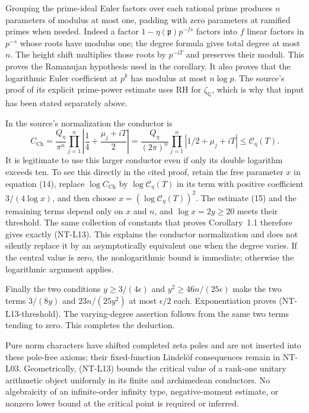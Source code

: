 Grouping the prime-ideal Euler factors over each rational
prime produces $n$ parameters of modulus at most one,
padding with zero parameters at ramified primes when needed.
Indeed a factor $1-\eta(\mathfrak p)p^{-fs}$ factors into
$f$ linear factors in $p^{-s}$ whose roots have modulus one;
the degree formula gives total degree at most $n$.
The height shift multiplies those roots by $p^{-iT}$ and
preserves their moduli.  This proves the Ramanujan hypothesis
used in the corollary.  It also proves that the logarithmic
Euler coefficient at $p^k$ has modulus at most $n\log p$.
The source's proof of its explicit prime-power estimate uses
RH for $\zeta_{\mathbb Q}$, which is why that input has been
stated separately above.

In the source's normalization the conductor is
\[
 C_{\mathrm{Ch}}=
 \frac{Q_\eta}{\pi^n}
        \prod_{j=1}^n\left|\frac14+
                              \frac{\mu_j+iT}{2}\right|
 =\frac{Q_\eta}{(2\pi)^n}
        \prod_{j=1}^n|1/2+\mu_j+iT|
 \le\mathscr C_\eta(T).
\]
It is legitimate to use this larger conductor even if only
its double logarithm exceeds ten.  To see this directly in
the cited proof, retain the free parameter $x$ in equation
(14), replace $\log C_{\mathrm{Ch}}$ by
$\log\mathscr C_\eta(T)$ in its term with positive
coefficient $3/(4\log x)$, and then choose
$x=(\log\mathscr C_\eta(T))^2$.
The estimate (15) and the remaining terms depend only on
$x$ and $n$, and $\log x=2y\ge20$ meets their threshold.
The same collection of constants that proves Corollary~1.1
therefore gives exactly (NT-L13).  This explains the conductor
normalization and does not silently replace it by an
asymptotically equivalent one when the degree varies.
If the central value is zero, the nonlogarithmic bound is
immediate; otherwise the logarithmic argument applies.

Finally the two conditions
$y\ge3/(4\epsilon)$ and
$y^2\ge46n/(25\epsilon)$ make the two terms
$3/(8y)$ and $23n/(25y^2)$ at most $\epsilon/2$ each.
Exponentiation proves (NT-L13-threshold).
The varying-degree assertion follows from the same two
terms tending to zero.  This completes the deduction.

Pure norm characters have shifted completed zeta poles and
are not inserted into these pole-free axioms; their fixed-function
Lindel\"of consequences remain in NT-L03.  Geometrically,
(NT-L13) bounds the critical value of a rank-one unitary
arithmetic object uniformly in its finite and archimedean
conductors.  No algebraicity of an infinite-order infinity
type, negative-moment estimate, or nonzero lower bound at the
critical point is required or inferred.

